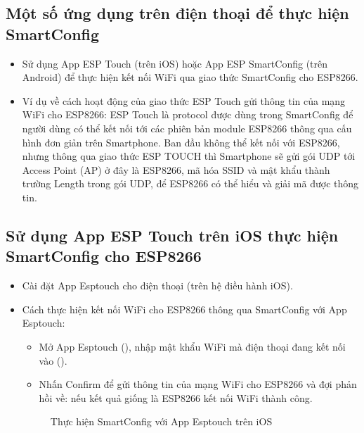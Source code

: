 \subsection{Một số ứng dụng trên điện thoại để thực hiện SmartConfig}
    \begin{itemize}
        \item Sử dụng App ESP Touch (trên iOS) hoặc App ESP SmartConfig (trên Android) để thực hiện kết nối WiFi qua giao thức SmartConfig cho ESP8266.

        \item Ví dụ về cách hoạt động của giao thức ESP Touch gửi thông tin của mạng WiFi cho ESP8266: ESP Touch là protocol được dùng trong SmartConfig để người dùng có thể kết nối tới các phiên bản module ESP8266 thông qua cấu hình đơn giản trên Smartphone. Ban đầu không thể kết nối với ESP8266, nhưng thông qua giao thức ESP TOUCH thì Smartphone sẽ gửi gói UDP tới Access Point (AP) ở đây là ESP8266, mã hóa SSID và mật khẩu thành trường Length trong gói UDP, để ESP8266 có thể hiểu và giải mã được thông tin.
    \end{itemize}
\subsection{Sử dụng App ESP Touch trên iOS thực hiện SmartConfig cho ESP8266}
    \begin{itemize}
        \item Cài đặt App Esptouch cho điện thoại (trên hệ điều hành iOS).
        \item Cách thực hiện kết nối WiFi cho ESP8266 thông qua SmartConfig với App Esptouch:
            \begin{itemize}
                \item Mở App Esptouch (\fig{\ref{Fig:esptouch-1}}), nhập mật khẩu WiFi mà điện thoại đang kết nối vào (\fig{\ref{Fig:esptouch-2}}).
                \item Nhấn Confirm để gửi thông tin của mạng WiFi cho ESP8266 và đợi phản hồi về: nếu kết quả giống \fig{\ref{Fig:esptouch-3}} là ESP8266 kết nối WiFi thành công.
            \end{itemize}
            \begin{figure}[htp]
                \begin{center}
                \end{center}
                \caption{Thực hiện SmartConfig với App Esptouch trên iOS}\label{Fig:smartconfig-esptouch}
            \end{figure}
    \end{itemize}

